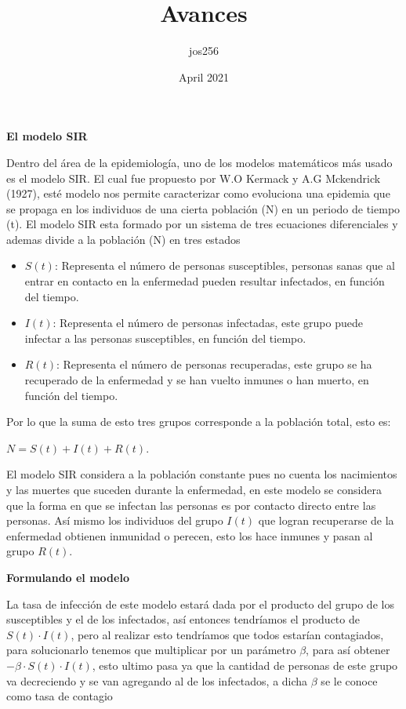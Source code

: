 \documentclass[a4paper,openright,12pt]{book}
\title{Avances}
\author{jos256 }
\date{April 2021}
\begin{document}
	\textbf{\LARGE{El modelo SIR}} \hfill \break
	
	Dentro del área de la epidemiología, uno de los modelos 	
	matemáticos más usado es el modelo SIR. El cual fue propuesto 	
	por W.O Kermack y A.G Mckendrick (1927), esté modelo nos permite
	caracterizar como evoluciona una epidemia que se propaga 
	en los individuos de una cierta población (N) en un periodo de tiempo 	    (t). El modelo SIR esta formado por un sistema de tres ecuaciones 	
	diferenciales y ademas divide a la población (N) en tres estados 		
	
		\begin{itemize}
			\item{$S \left(t\right)$: Representa el número de personas 					susceptibles, personas sanas que al entrar en contacto en 	
			la enfermedad pueden resultar infectados, en función del	
			tiempo.}
			
			\item{$I \left(t\right)$: Representa el número de personas	
			infectadas, este grupo puede infectar a las personas
			susceptibles, en función del tiempo.}
			
			\item{$R \left(t\right)$: Representa el número de personas
			recuperadas, este grupo se ha recuperado de la enfermedad 
			y se han vuelto inmunes o han muerto, en función del tiempo. }
		\end{itemize}
	
	Por lo que la suma de esto tres grupos corresponde a la población   		total, esto es: 
		\begin{center}
		$N = S \left(t\right)+ I\left(t\right) + R \left(t\right)$.
		\end{center}
	El modelo SIR considera a la población constante pues no cuenta	
	los nacimientos y las muertes que suceden durante la enfermedad,
	en este modelo se considera que la forma en que se infectan las 	  		personas es por contacto directo entre las personas. Así mismo los	
	individuos del grupo $I \left(t\right)$ que logran recuperarse de 	
	la enfermedad obtienen inmunidad o perecen, esto los hace inmunes 	
	y pasan al grupo $R \left(t\right).$\nocite{allman2004mathematical}
	\hfill \break
	
	\textbf{\Large{Formulando el modelo}} \hfill \break
	
	La tasa de infección de este modelo estará dada por 	
	el producto del grupo de los susceptibles y el de los infectados, así 	
	entonces tendríamos el producto de $S \left(t\right) \cdot I \left(t		\right)$, pero al realizar esto tendríamos que todos estarían 	
	contagiados, para solucionarlo tenemos que multiplicar por un 	
	parámetro $\beta$, para así obtener $-\beta \cdot S \left(t\right) 			\cdot I \left(t	\right)$, esto ultimo pasa ya que la cantidad de 			personas de este grupo va decreciendo y se van agregando al de los 	
	infectados, a dicha $\beta$ se le conoce como tasa de contagio
	\hfill \break
	
\end{document}
